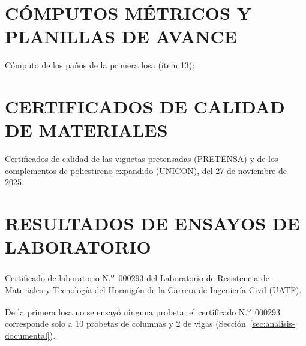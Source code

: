 \chapter{CÓMPUTOS MÉTRICOS Y PLANILLAS DE AVANCE}

Cómputo de los paños de la primera losa (ítem 13):


\chapter{CERTIFICADOS DE CALIDAD DE MATERIALES}
Certificados de calidad de las viguetas pretensadas (PRETENSA) y de los complementos de poliestireno expandido (UNICON), del 27 de noviembre de 2025.


\chapter{RESULTADOS DE ENSAYOS DE LABORATORIO}
Certificado de laboratorio N.\textsuperscript{o}~000293 del Laboratorio de Resistencia de Materiales y Tecnología del Hormigón de la Carrera de Ingeniería Civil (UATF).

De la primera losa no se ensayó ninguna probeta: el certificado N.\textsuperscript{o}~000293 corresponde solo a 10 probetas de columnas y 2 de vigas (Sección~\ref{sec:analisis-documental}).

